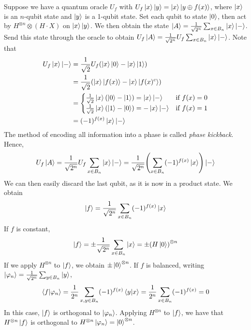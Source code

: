 Suppose we have a quantum oracle \( U_f \) with \( U_f \ket{x} \ket{y} = \ket{x} \ket{y \oplus f(x)} \), where \( \ket{x} \) is an \( n \)-qubit state and \( \ket{y} \) is a 1-qubit state.
Set each qubit to state \( \ket{0} \), then act by \( H^{\otimes n} \otimes (H \cdot X) \) on \( \ket{x} \ket{y} \).
We then obtain the state \( \ket{A} = \frac{1}{\sqrt{2^n}} \sum_{x \in B_n} \ket{x} \ket{-} \).
Send this state through the oracle to obtain \( U_f \ket{A} = \frac{1}{\sqrt{2^n}} U_f \sum_{x \in B_n} \ket{x} \ket{-} \).
Note that
\begin{align*}
    U_f \ket{x} \ket{-} &= \frac{1}{\sqrt{2}} U_f \qty(\ket{x}\ket{0} - \ket{x}\ket{1}) \\
    &= \frac{1}{\sqrt{2}} \qty(\ket{x}\ket{f(x)} - \ket{x}\ket{f(x)^c}) \\
    &= \begin{cases}
        \frac{1}{\sqrt{2}}\ket{x}(\ket{0} - \ket{1}) = \ket{x}\ket{-} & \text{if } f(x) = 0 \\
        \frac{1}{\sqrt{2}}\ket{x}(\ket{1} - \ket{0}) = -\ket{x}\ket{-} & \text{if } f(x) = 1
    \end{cases} \\
    &= (-1)^{f(x)} \ket{x}\ket{-}
\end{align*}
The method of encoding all information into a phase is called \emph{phase kickback}.
Hence,
\[ U_f \ket{A} = \frac{1}{\sqrt{2^n}} U_f \sum_{x \in B_n} \ket{x} \ket{-} = \frac{1}{\sqrt{2^n}} \qty(\sum_{x \in B_n} (-1)^{f(x)} \ket{x}) \ket{-} \]
We can then easily discard the last qubit, as it is now in a product state.
We obtain
\[ \ket{f} = \frac{1}{\sqrt{2^n}} \sum_{x \in B_n} (-1)^{f(x)} \ket{x} \]
If \( f \) is constant,
\[ \ket{f} = \pm \frac{1}{\sqrt{2^n}} \sum_{x \in B_n} \ket{x} = \pm \qty(H \ket{0})^{\otimes n} \]
If we apply \( H^{\otimes n} \) to \( \ket{f} \), we obtain \( \pm \ket{0}^{\otimes n} \).
If \( f \) is balanced, writing \( \ket{\varphi_n} = \frac{1}{\sqrt{2^n}} \sum_{y \in B_n} \ket{y} \),
\[ \ip{f}{\varphi_n} = \frac{1}{2^n} \sum_{x, y \in B_n} (-1)^{f(x)} \ip{y}{x} = \frac{1}{2^n} \sum_{x \in B_n} (-1)^{f(x)} = 0 \]
In this case, \( \ket{f} \) is orthogonal to \( \ket{\varphi_n} \).
Applying \( H^{\otimes n} \) to \( \ket{f} \), we have that \( H^{\otimes n} \ket{f} \) is orthogonal to \( H^{\otimes n} \ket{\varphi_n} = \ket{0}^{\otimes n} \).

